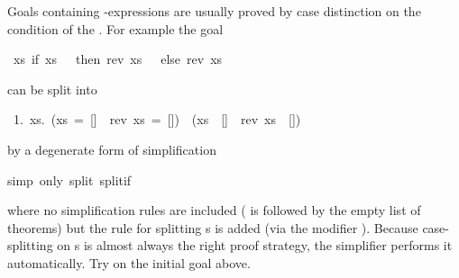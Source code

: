 %
\begin{isabellebody}%
%
\begin{isamarkuptext}%
Goals containing -expressions are usually proved by case
distinction on the condition of the . For example the goal%
\end{isamarkuptext}%
\ {\isachardoublequote}{\isasymforall}xs{\isachardot}\ if\ xs\ {\isacharequal}\ {\isacharbrackleft}{\isacharbrackright}\ then\ rev\ xs\ {\isacharequal}\ {\isacharbrackleft}{\isacharbrackright}\ else\ rev\ xs\ {\isasymnoteq}\ {\isacharbrackleft}{\isacharbrackright}{\isachardoublequote}%
\begin{isamarkuptxt}%
\noindent
can be split into
\begin{isabellepar}%
~1.~{\isasymforall}xs.~(xs~=~[]~{\isasymlongrightarrow}~rev~xs~=~[])~{\isasymand}~(xs~{\isasymnoteq}~[]~{\isasymlongrightarrow}~rev~xs~{\isasymnoteq}~[])%
\end{isabellepar}%
by a degenerate form of simplification%
\end{isamarkuptxt}%
simp\ only{\isacharcolon}\ split{\isacharcolon}\ split{\isacharunderscore}if{\isacharparenright}%
\begin{isamarkuptext}%
\noindent
where no simplification rules are included ( is followed by the
empty list of theorems) but the rule  for
splitting s is added (via the modifier ). Because
case-splitting on s is almost always the right proof strategy, the
simplifier performs it automatically. Try 
on the initial goal above.


\end{isamarkuptext}
\end{isabellebody}

